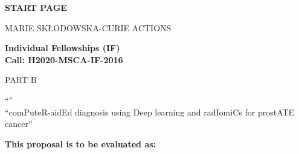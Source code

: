 \phantom{a}
\vspace{15mm}
\begin{center}


        \Large{


        \textbf{START PAGE}

          \vspace{15mm}
          MARIE SK\L{}ODOWSKA-CURIE ACTIONS\\
          \vspace{1cm}

          \textbf{Individual Fellowships (IF)}\\
          \textbf{Call: H2020-MSCA-IF-2016}
          \vspace{2cm}

          PART B
          \vspace{2.5cm}

          ``\proposalAcronym''\\
          \vspace{1cm}
          ``comPuteR-aidEd diagnosis using Deep learning and radIomiCs for prostATE cancer''
          \vspace{1cm}

          \textbf{This proposal is to be evaluated as:}
          \vspace{.5cm}

          \textbf{\evaluationPannel}
        }

  \end{center}
\vspace{1cm}

